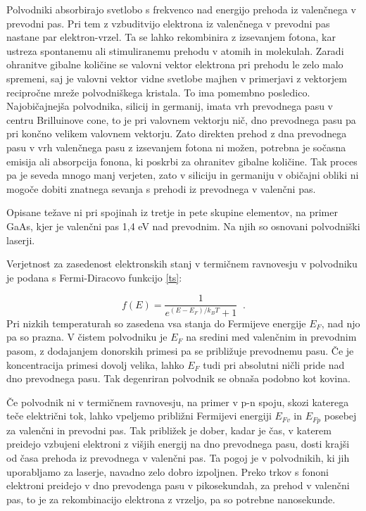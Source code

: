 Polvodniki absorbirajo svetlobo s frekvenco nad energijo prehoda iz
valenčnega v prevodni pas. Pri tem z vzbuditvijo elektrona iz valenčnega v
prevodni pas nastane par elektron-vrzel. Ta se lahko rekombinira z
izsevanjem fotona, kar ustreza spontanemu ali stimuliranemu prehodu v atomih
in molekulah. Zaradi ohranitve gibalne količine se valovni vektor elektrona
pri prehodu le zelo malo spremeni, saj je valovni vektor vidne svetlobe
majhen v primerjavi z vektorjem recipročne mreže polvodniškega kristala.
To ima pomembno posledico. Najobičajnejša polvodnika, silicij in germanij,
imata vrh prevodnega pasu v centru Brilluinove cone, to je pri valovnem
vektorju nič, dno prevodnega pasu pa pri končno velikem valovnem vektorju.
Zato direkten prehod z dna prevodnega pasu v vrh valenčnega pasu z
izsevanjem fotona ni možen, potrebna je sočasna emisija ali absorpcija
fonona, ki poskrbi za ohranitev gibalne količine. Tak proces pa je seveda
mnogo manj verjeten, zato v siliciju in germaniju v običajni obliki ni
mogoče dobiti znatnega sevanja s prehodi iz prevodnega v valenčni pas.

Opisane težave ni pri spojinah iz tretje in pete skupine elementov, na
primer GaAs, kjer je valenčni pas 1,4 eV nad prevodnim. Na njih so osnovani
polvodniški laserji.

Verjetnost za zasedenost elektronskih stanj v termičnem ravnovesju v
polvodniku je podana s Fermi-Diracovo funkcijo \ref{ts}:

\begin{equation}  \label{6.1}
f(E)=\frac{1}{e^{(E-E_F)/k_B T}+1}\;\;.
\end{equation}
Pri nizkih temperaturah so zasedena vsa stanja do Fermijeve energije $E_F$,
nad njo pa so prazna. V čistem polvodniku je $E_F$ na sredini med
valenčnim in prevodnim pasom, z dodajanjem donorskih primesi pa se
približuje prevodnemu pasu. Če je koncentracija primesi dovolj velika,
lahko $E_F$ tudi pri absolutni ničli pride nad dno prevodnega pasu. Tak
degenriran polvodnik se obnaša podobno kot kovina.

Če polvodnik ni v termičnem ravnovesju, na primer v p-n spoju, skozi
katerega teče električni tok, lahko vpeljemo približni Fermijevi energiji 
$E_{Fv}$ in $E_{Fp}$ posebej za valenčni in prevodni pas. Tak približek je
dober, kadar je čas, v katerem preidejo vzbujeni elektroni z višjih
energij na dno prevodnega pasu, dosti krajši od časa prehoda iz prevodnega
v valenčni pas. Ta pogoj je v polvodnikih, ki jih uporabljamo za laserje,
navadno zelo dobro izpoljnen. Preko trkov s fononi elektroni preidejo v dno
prevodenga pasu v pikosekundah, za prehod v valenčni pas, to je za
rekombinacijo elektrona z vrzeljo, pa so potrebne nanosekunde.

